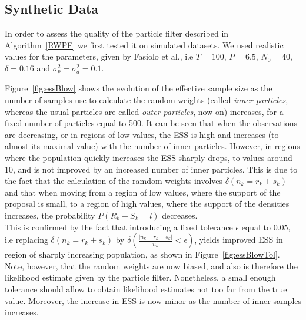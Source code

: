 \documentclass[12pt]{article}
\begin{document}
	\subsection{Synthetic Data}
	In order to assess the quality of the particle filter described in Algorithm~\ref{RWPF} we first tested it on simulated datasets. We used realistic values for the parameters, given by Fasiolo et al.\cite{fasiolo2014statistical}, i.e $T=100$, $P=6.5$, $N_0=40$, $\delta=0.16$ and $\sigma_p^2=\sigma_d^2=0.1$.
	
	Figure~\ref{fig:essBlow} shows the evolution of the effective sample size as the number of samples use to calculate the random weights (called \emph{inner particles}, whereas the usual particles are called \emph{outer particles}, now on) increases, for a fixed number of particles equal to 500. It can be seen that when the observations are decreasing, or in regions of low values, the ESS is high and increases (to almost its maximal value) with the number of inner particles. However, in regions where the population quickly increases the ESS sharply drops, to values around 10, and is not improved by an increased number of inner particles. This is due to the fact that the calculation of the ramdom weights involves $\delta(n_k = r_k+s_k)$ and that when moving from a region of low values, where the support of the proposal is small, to a region of high values, where the support of the densities increases, the probability $P(R_k+S_k=l)$ decreases. \\
	This is confirmed by the fact that introducing a fixed tolerance $\epsilon$  equal to 0.05, i.e replacing $\delta(n_k = r_k+s_k)$ by $\delta(\frac{|n_k - r_k-s_k|}{n_k} < \epsilon)$, yields improved ESS in region of sharply increasing population, as shown in Figure~\ref{fig:essBlowTol}. Note, however, that the random weights are now biased, and also is therefore the likelihood estimate given by the particle filter. Nonetheless, a small enough tolerance should allow to obtain likelihood estimates not too far from the true value. Moreover, the increase in ESS is now minor as the number of inner samples increases.
	
\end{document}
